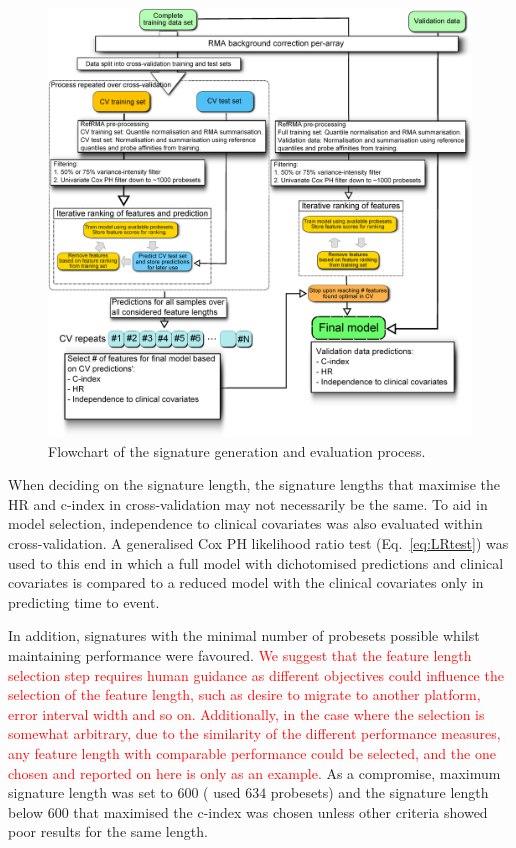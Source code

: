 \documentclass[letterpaper,12pt]{article}
\begin{document}
\begin{figure}[!th]
\centering
\includegraphics[scale=0.30]{Figures/WorkflowOverview.eps}
\caption{Flowchart of the signature generation and evaluation process.}
\label{Fig:SignGenFlowchart}
\end{figure}

When deciding on the signature length, the signature lengths that maximise the HR and c-index in cross-validation may not necessarily be the same. To aid in model selection, independence to clinical covariates was also evaluated within cross-validation. A generalised Cox PH likelihood ratio test (Eq.\ \ref{eq:LRtest}) was used to this end in which a full model with dichotomised predictions and clinical covariates is compared to a reduced model with the clinical covariates only in predicting time to event. 

In addition, signatures with the minimal number of probesets possible whilst maintaining performance were favoured. \textcolor{red}{We suggest that the feature length selection step requires human guidance as different objectives could influence the selection of the feature length, such as desire to migrate to another platform, error interval width and so on.  Additionally, in the case where the selection is somewhat arbitrary, due to the similarity of the different performance measures, any feature length with comparable performance could be selected, and the one chosen and reported on here is only as an example.} As a compromise, maximum signature length was set to $600$ (\citet{Kennedy:11} used $634$ probesets) and the signature length below $600$ that maximised the c-index was chosen unless other criteria showed poor results for the same length.
\end{document}
